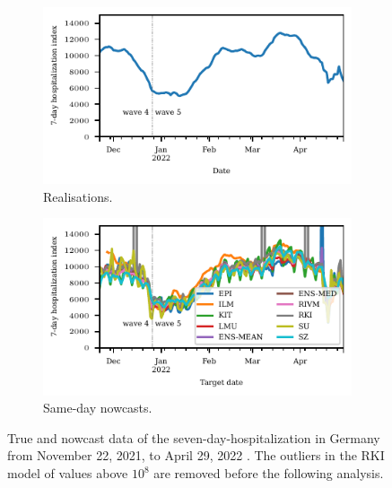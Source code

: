 \begin{figure}
    \centering
    \begin{subfigure}[t]{0.48\textwidth}
    \includegraphics{plots/covid_nowcast/00_true_data.pdf}
    \caption{Realisations.}
    \label{fig:app-covid-true}
    \end{subfigure}\hfill
    \begin{subfigure}[t]{0.48\textwidth}
    \includegraphics{plots/covid_nowcast/00_nowcast_data.pdf}
    \caption{Same-day nowcasts.}
    \label{fig:app-covid-nowcast}
        \end{subfigure}
    \caption{True and nowcast data of the seven-day-hospitalization in Germany from November 22, 2021, to April 29, 2022 \parencite{ChairOfEconometricsAndStatisticsAtKarlsruheInstituteOfTechnology2024}.
    The outliers in the RKI model of values above $10^8$ are removed before the following analysis.}
    \label{fig:app-covid-true-nowcast}
\end{figure}

